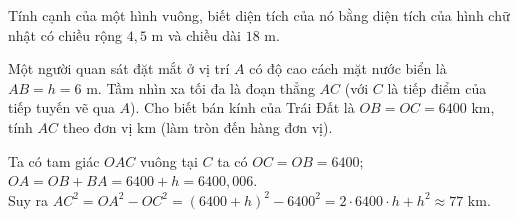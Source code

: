 \begin{bt}%
Tính cạnh của một hình vuông, biết diện tích của nó bằng diện tích của hình chữ nhật có chiều rộng $4,5$ m và chiều dài $18$ m.
\end{bt}


\begin{bt}%
\immini
{Một người quan sát đặt mắt ở vị trí $A$ có độ cao cách mặt nước biển là $AB = h = 6$ m. Tầm nhìn xa tối đa là đoạn thẳng $AC$ (với $C$ là tiếp điểm của tiếp tuyến vẽ qua $A$). Cho biết bán kính của Trái Đất là $OB = OC = 6400$ km, tính $AC$ theo đơn vị km (làm tròn đến hàng đơn vị).}
{}
\loigiai
{Ta có tam giác $OAC$ vuông tại $C$ ta có $OC = OB = 6400$; $OA = OB + BA = 6400 + h = 6400{,}006$.\\
	Suy ra $AC^2 = OA^2 - OC^2 =(6400 + h)^2 - 6400^2 = 2\cdot6400\cdot h + h^2 \approx 77$ km.}
\end{bt}

